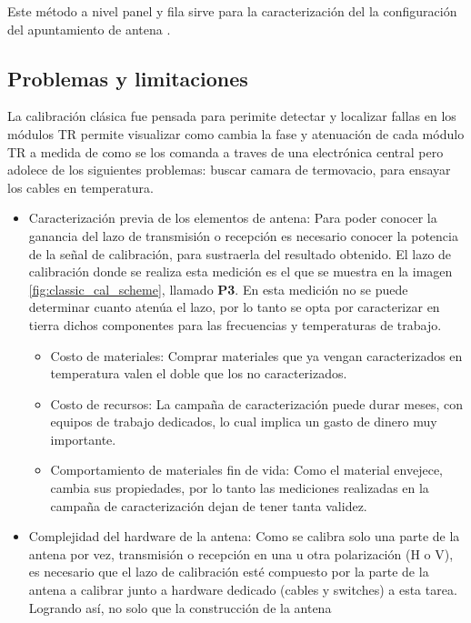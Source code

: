 Este método a nivel panel y fila sirve para la caracterización del la configuración del apuntamiento de antena \cite{Br2007}.

\subsection{Problemas y limitaciones}

La calibración clásica fue pensada para perimite detectar y localizar fallas en los módulos TR permite visualizar como 
cambia la fase y atenuación de cada módulo TR a medida de como se los comanda a traves de una electrónica central
pero adolece de los siguientes problemas:
buscar camara de termovacio, para ensayar los cables en temperatura.


\begin{itemize}
	\item Caracterización previa de los elementos de antena: Para poder conocer la ganancia del lazo de transmisión o recepción
es necesario conocer la potencia de la señal de calibración, para sustraerla del resultado obtenido. El lazo de calibración 
donde se realiza esta medición es el que se muestra en la imagen \ref{fig:classic_cal_scheme}, llamado \textbf{P3}. En esta 
medición no se puede determinar cuanto atenúa el lazo, por lo tanto se opta por caracterizar en tierra dichos componentes 
para las frecuencias y temperaturas de trabajo. 
	\begin{itemize}
		\item Costo de materiales: Comprar materiales que ya vengan caracterizados en temperatura valen el doble que los no 
			caracterizados.
		\item Costo de recursos: La campaña de caracterización puede durar meses, con equipos de trabajo dedicados, lo cual implica
			un gasto de dinero muy importante. 
		\item Comportamiento de materiales fin de vida: Como el material envejece, cambia sus propiedades, por lo tanto las mediciones realizadas 
			en la campaña de caracterización dejan de tener tanta validez.
	\end{itemize}
	\item Complejidad del hardware de la antena: Como se calibra solo una parte de la antena por vez, transmisión o recepción en 
		una u otra polarización (H o V), es necesario que el lazo de calibración esté compuesto por la parte de la antena a 
		calibrar junto a hardware dedicado (cables y switches) a esta tarea. Logrando así, no solo que la construcción de la antena 

\end{itemize}
